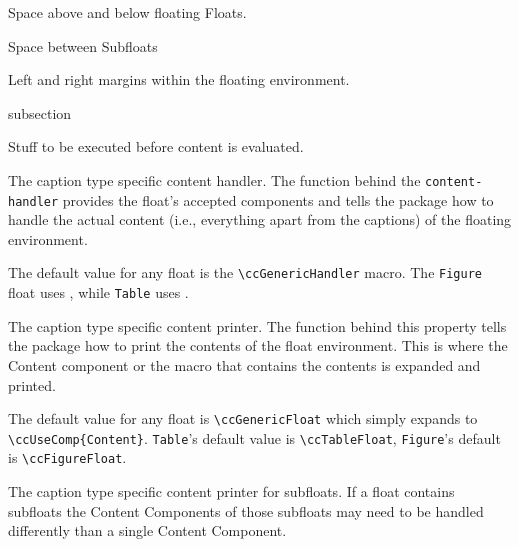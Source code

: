 Space above and below floating Floats.


Space between Subfloats


Left and right margins within the floating environment.


\begin{Heading}[label=sec:flt:comp]{subsection}
\end{Heading}


Stuff to be executed before content is evaluated.


The caption type specific content handler. The function behind the
\lstinline{content-handler} provides the float's accepted components
and tells the package how to handle the actual content (i.e.,
everything apart from the captions) of the floating environment.

The default value for any float is the \lstinline{\ccGenericHandler}
macro. The \lstinline{Figure} float uses
\texttt{\string\ccFigureHandler}, while \lstinline{Table} uses
\texttt{\string\ccTableHandler}.


The caption type specific content printer. The function behind this
property tells the package how to print the contents of the float
environment. This is where the Content component or the macro that
contains the contents is expanded and printed.

The default value for any float is \lstinline{\ccGenericFloat} which
simply expands to
\lstinline|\ccUseComp{Content}|. \lstinline{Table}'s default value
is \lstinline{\ccTableFloat}, \lstinline{Figure}'s default is
\lstinline{\ccFigureFloat}.


The caption type specific content printer for subfloats. If a float
contains subfloats the Content Components of those subfloats may need
to be handled differently than a single Content Component.


